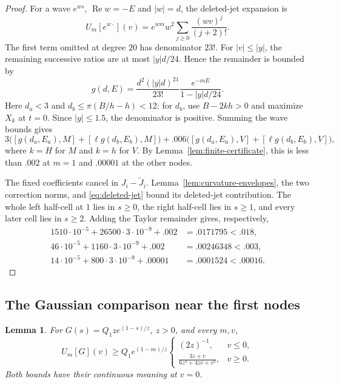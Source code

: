 \documentclass[11pt]{article}
\newtheorem{lemma}[theorem]{Lemma}
\theoremstyle{remark}\newtheorem{remark}[theorem]{Remark}
\begin{document}
\begin{proof}
For a wave $e^{ws}$, $\operatorname{Re}w=-E$ and $|w|=d$, the
deleted-jet expansion is
\[
 U_m[e^{w\cdot}](v)=e^{wm}w^2
            \sum_{j\ge0}\frac{(wv)^j}{(j+2)!}.
\]
The first term omitted at degree $20$ has denominator $23!$.
For $|v|\le|y|$, the remaining successive ratios are at most
$|y|d/24$.  Hence the remainder is bounded by
\[
 g(d,E)=\frac{d^2(|y|d)^{21}}{23!}
          \frac{e^{-mE}}{1-|y|d/24}.
\]
Here $d_a<3$ and $d_b\le\pi(B/h-h)<12$: for $d_b$, use
$B-2kh>0$ and maximize $X_k$ at $t=0$.
Since $|y|\le1.5$, the denominator is positive.  Summing the wave
bounds gives
\[
 3\bigl([g(d_a,E_a),M]+[\ell g(d_b,E_b),M]\bigr)
 +.006\bigl([g(d_a,E_a),V]+[\ell g(d_b,E_b),V]\bigr),
\]
where $k=H$ for $M$ and $k=h$ for $V$.  By
Lemma~\ref{lem:finite-certificate}, this is less than $.002$ at
$m=1$ and $.00001$ at the other nodes.

The fixed coefficients cancel in $J_i-\widetilde J_i$.
Lemma~\ref{lem:curvature-envelopes}, the two correction norms, and
\eqref{eq:deleted-jet} bound its deleted-jet contribution.  The
whole left half-cell at $1$ lies in $s\ge0$, the right half-cell
lies in $s\ge1$, and every later cell lies in $s\ge2$.  Adding
the Taylor remainder gives, respectively,
\[
\begin{split}
 1510\cdot10^{-5}+26500\cdot3\cdot10^{-9}+.002
     &=.0171795<.018,\\
 46\cdot10^{-5}+1160\cdot3\cdot10^{-9}+.002
     &=.00246348<.003,\\
 14\cdot10^{-5}+800\cdot3\cdot10^{-9}+.00001
     &=.0001524<.00016.
\end{split}
\]
\end{proof}

\subsection{The Gaussian comparison near the first nodes}

\begin{lemma}\label{lem:gaussian-divided-difference}
For $G(s)=Q_1ze^{(1-s)/z}$, $z>0$, and every $m,v$,
\begin{equation}\label{eq:gaussian-divided-difference}
 U_m[G](v)\ge Q_1e^{(1-m)/z}
 \begin{cases}
 (2z)^{-1},&v\le0,\\[2pt]
 \displaystyle\frac{3z+v}{6z^2+4zv+v^2},&v\ge0.
 \end{cases}
\end{equation}
Both bounds have their continuous meaning at $v=0$.
\end{lemma}
\end{document}
